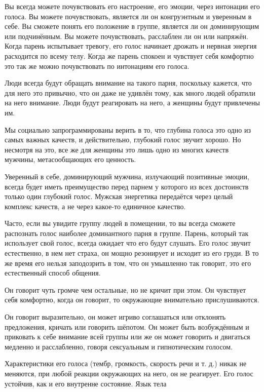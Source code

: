 Вы всегда можете почувствовать его настроение, его эмоции, через интонации его голоса. Вы можете почувствовать, является ли он конгруэнтным и уверенным в себе. Вы сможете понять его положение в группе, является ли он доминирующим или подчинённым. Вы можете почувствовать, расслаблен ли он или напряжён. Когда парень испытывает тревогу, его голос начинает дрожать и нервная энергия расходится по всему телу. Когда же парень спокоен и чувствует себя комфортно это так же можно почувствовать по интонациям его голоса.

Люди всегда будут обращать внимание на такого парня, поскольку кажется, что для него это привычно, что он даже не удивлён тому, как много людей обратили на него внимание. Люди будут реагировать на него, а женщины будут привлечены им.

Мы социально запрограммированы верить в то, что глубина голоса это одно из самых важных качеств, и действительно, глубокий голос звучит хорошо. Но несмотря на это, все же для женщины это лишь одно из многих качеств мужчины, метасообщающих его ценность.

Уверенный в себе, доминирующий мужчина, излучающий позитивные эмоции, всегда будет иметь преимущество перед парнем у которого из всех достоинств только один глубокий голос. Мужская энергетика передаётся через целый комплекс качеств, а не через какое-то единичное качество.

Часто, если вы увидите группу людей в помещении, то вы всегда сможете распознать голос наиболее доминантного парня в группе. Парень, который так использует свой голос, всегда ожидает что его будут слушать. Его голос звучит естественно, в нем нет страха, он мощно резонирует и исходит из его груди. В то же время его нельзя заподозрить в том, что он умышленно так говорит, это его естественный способ общения.

Он говорит чуть громче чем остальные, но не кричит при этом. Он чувствует себя комфортно, когда он говорит, то окружающие внимательно прислушиваются.

Он говорит выразительно, он может игриво соглашаться или отклонять предложения, кричать или говорить шёпотом. Он может быть возбуждённым и приковать к себе внимание всей группы или же он может говорить и двигаться медленно и расслабленно, говоря сексуальным и гипнотическим голосом.

Характеристики его голоса (тембр, громкость, скорость речи и т. д.) никак не меняются, при любой реакции окружающих на него, он не реагирует. Его голос устойчив, как и его внутренне состояние.
Язык тела


